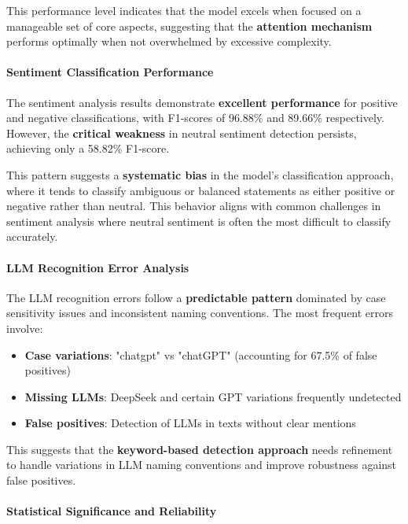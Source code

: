 This performance level indicates that the model excels when focused on a manageable set of core aspects, suggesting that the \textbf{attention mechanism} performs optimally when not overwhelmed by excessive complexity.

\paragraph{Sentiment Classification Performance}

The sentiment analysis results demonstrate \textbf{excellent performance} for positive and negative classifications, with F1-scores of 96.88\% and 89.66\% respectively. However, the \textbf{critical weakness} in neutral sentiment detection persists, achieving only a 58.82\% F1-score.

This pattern suggests a \textbf{systematic bias} in the model's classification approach, where it tends to classify ambiguous or balanced statements as either positive or negative rather than neutral. This behavior aligns with common challenges in sentiment analysis where neutral sentiment is often the most difficult to classify accurately.

\paragraph{LLM Recognition Error Analysis}

The LLM recognition errors follow a \textbf{predictable pattern} dominated by case sensitivity issues and inconsistent naming conventions. The most frequent errors involve:
\begin{itemize}
    \item \textbf{Case variations}: "chatgpt" vs "chatGPT" (accounting for 67.5\% of false positives)
    \item \textbf{Missing LLMs}: DeepSeek and certain GPT variations frequently undetected
    \item \textbf{False positives}: Detection of LLMs in texts without clear mentions
\end{itemize}

This suggests that the \textbf{keyword-based detection approach} needs refinement to handle variations in LLM naming conventions and improve robustness against false positives.

\paragraph{Statistical Significance and Reliability}

